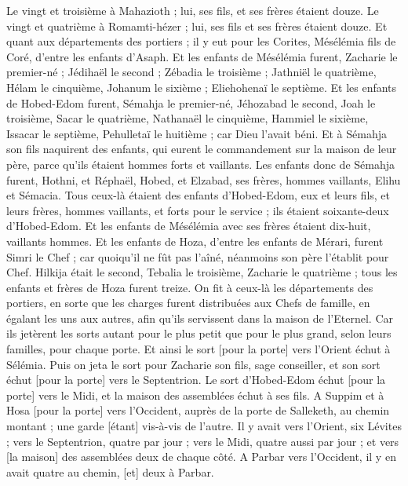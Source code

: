 \begin{multicols}{2}
Le vingt et troisième à Mahazioth ; lui, ses fils, et ses frères étaient douze.
Le vingt et quatrième à Romamti-hézer ; lui, ses fils et ses frères étaient douze.
\VerseOne{}Et quant aux départements des portiers ; il y eut pour les Corites, Mésélémia fils de Coré, d'entre les enfants d'Asaph.
Et les enfants de Mésélémia furent, Zacharie le premier-né ; Jédihaël le second ; Zébadia le troisième ; Jathniël le quatrième,
Hélam le cinquième, Johanum le sixième ; Eliehohenaï le septième.
Et les enfants de Hobed-Edom furent, Sémahja le premier-né, Jéhozabad le second, Joah le troisième, Sacar le quatrième, Nathanaël le cinquième,
Hammiel le sixième, Issacar le septième, Pehulletaï le huitième ; car Dieu l'avait béni.
Et à Sémahja son fils naquirent des enfants, qui eurent le commandement sur la maison de leur père, parce qu'ils étaient hommes forts et vaillants.
Les enfants donc de Sémahja furent, Hothni, et Réphaël, Hobed, et Elzabad, ses frères, hommes vaillants, Elihu et Sémacia.
Tous ceux-là étaient des enfants d'Hobed-Edom, eux et leurs fils, et leurs frères, hommes vaillants, et forts pour le service ; ils étaient soixante-deux d'Hobed-Edom.
Et les enfants de Mésélémia avec ses frères étaient dix-huit, vaillants hommes.
Et les enfants de Hoza, d'entre les enfants de Mérari, furent Simri le Chef ; car quoiqu'il ne fût pas l'aîné, néanmoins son père l'établit pour Chef.
Hilkija était le second, Tebalia le troisième, Zacharie le quatrième ; tous les enfants et frères de Hoza furent treize.
On fit à ceux-là les départements des portiers, en sorte que les charges furent distribuées aux Chefs de famille, en égalant les uns aux autres, afin qu'ils servissent dans la maison de l'Eternel.
Car ils jetèrent les sorts autant pour le plus petit que pour le plus grand, selon leurs familles, pour chaque porte.
Et ainsi le sort [pour la porte] vers l'Orient échut à Sélémia. Puis on jeta le sort pour Zacharie son fils, sage conseiller, et son sort échut [pour la porte] vers le Septentrion.
Le sort d'Hobed-Edom échut [pour la porte] vers le Midi, et la maison des assemblées échut à ses fils.
A Suppim et à Hosa [pour la porte] vers l'Occident, auprès de la porte de Salleketh, au chemin montant ; une garde [étant] vis-à-vis de l'autre.
Il y avait vers l'Orient, six Lévites ; vers le Septentrion, quatre par jour ; vers le Midi, quatre aussi par jour ; et vers [la maison] des assemblées deux de chaque côté.
A Parbar vers l'Occident, il y en avait quatre au chemin, [et] deux à Parbar.

\end{multicols}
